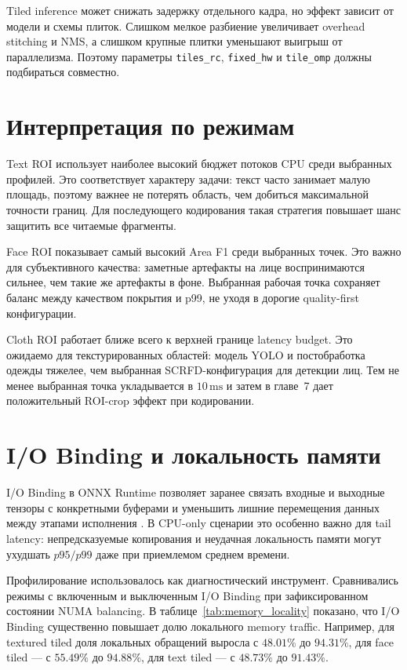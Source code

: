 \documentclass[12pt,a4paper,oneside,openany]{report}
\newcommand{\ms}{\mathrm{ms}}
\begin{document}
Tiled inference может снижать задержку отдельного кадра, но эффект зависит от модели и схемы
плиток. Слишком мелкое разбиение увеличивает overhead stitching и NMS, а слишком крупные плитки
уменьшают выигрыш от параллелизма. Поэтому параметры \texttt{tiles\_rc}, \texttt{fixed\_hw} и
\texttt{tile\_omp} должны подбираться совместно.


\section{Интерпретация по режимам}

Text ROI использует наиболее высокий бюджет потоков CPU среди выбранных профилей. Это
соответствует характеру задачи: текст часто занимает малую площадь, поэтому важнее не потерять
область, чем добиться максимальной точности границ. Для последующего кодирования такая стратегия
повышает шанс защитить все читаемые фрагменты.

Face ROI показывает самый высокий Area F1 среди выбранных точек. Это важно для субъективного
качества: заметные артефакты на лице воспринимаются сильнее, чем такие же артефакты в фоне.
Выбранная рабочая точка сохраняет баланс между качеством покрытия и p99, не уходя в дорогие
quality-first конфигурации.

Cloth ROI работает ближе всего к верхней границе latency budget. Это ожидаемо для
текстурированных областей: модель YOLO и постобработка одежды тяжелее, чем выбранная
SCRFD-конфигурация для детекции лиц. Тем не менее выбранная точка укладывается в $10\,\ms$ и
затем в главе~7 дает положительный ROI-crop эффект при кодировании.


\section{I/O Binding и локальность памяти}

I/O Binding в ONNX Runtime позволяет заранее связать входные и выходные тензоры с конкретными
буферами и уменьшить лишние перемещения данных между этапами исполнения \cite{ort_iobinding}. В
CPU-only сценарии это особенно важно для tail latency: непредсказуемые копирования и неудачная
локальность памяти могут ухудшать $p95/p99$ даже при приемлемом среднем времени.

Профилирование использовалось как диагностический инструмент. Сравнивались режимы с включенным и
выключенным I/O Binding при зафиксированном состоянии NUMA balancing. В
таблице~\ref{tab:memory_locality} показано, что I/O Binding существенно повышает долю локального
memory traffic. Например, для textured tiled доля локальных обращений выросла с $48.01\%$ до
$94.31\%$, для face tiled --- с $55.49\%$ до $94.88\%$, для text tiled --- с $48.73\%$ до
$91.43\%$.
\end{document}
